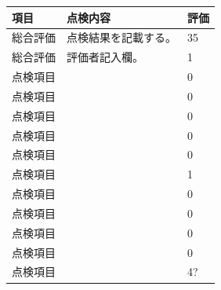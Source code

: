 \documentclass[UTF8,10pt,a4paper,fontset=fandol]{ctexart}
\newcommand{\fieldvalue}[1]{#1}
\newcommand{\handwritten}[1]{#1}
\begin{document}
\begin{tabularx}{\textwidth}{|p{}|X|p{}|}
\hline
項目 & 点検内容 & 評価 \\
\hline
総合評価 &
点検結果を記載する。 &
\fieldvalue{\handwritten{35}} \\
\hline
総合評価 &
評価者記入欄。 &
\fieldvalue{\handwritten{1}} \\
\hline
\multicolumn{2}{|l|}{点検項目} &
\fieldvalue{\handwritten{0}} \\
\hline
\multicolumn{2}{|l|}{点検項目} &
\fieldvalue{\handwritten{0}} \\
\hline
\multicolumn{2}{|l|}{点検項目} &
\fieldvalue{\handwritten{0}} \\
\hline
\multicolumn{2}{|l|}{点検項目} &
\fieldvalue{\handwritten{0}} \\
\hline
\multicolumn{2}{|l|}{点検項目} &
\fieldvalue{\handwritten{0}} \\
\hline
\multicolumn{2}{|l|}{点検項目} &
\fieldvalue{\handwritten{1}} \\
\hline
\multicolumn{2}{|l|}{点検項目} &
\fieldvalue{\handwritten{0}} \\
\hline
\multicolumn{2}{|l|}{点検項目} &
\fieldvalue{\handwritten{0}} \\
\hline
\multicolumn{2}{|l|}{点検項目} &
\fieldvalue{\handwritten{0}} \\
\hline
\multicolumn{2}{|l|}{点検項目} &
\fieldvalue{\handwritten{0}} \\
\hline
\multicolumn{2}{|l|}{点検項目} &
\fieldvalue{\handwritten{4?}} \\

\end{tabularx}
\end{document}
